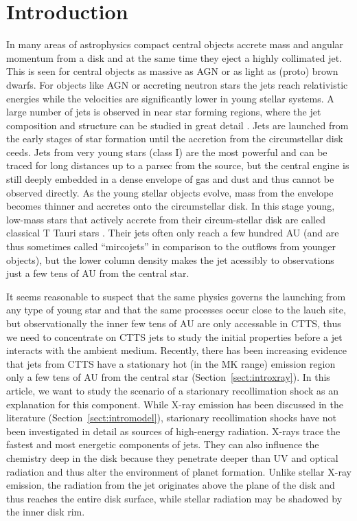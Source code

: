 \section{Introduction} 
In many areas of astrophysics compact central objects accrete mass and angular momentum from a disk and at the same time they eject a highly collimated jet. This is seen for central objects as massive as AGN or as light as (proto) brown dwarfs. For objects like AGN or accreting neutron stars the jets reach relativistic energies while the velocities are significantly lower in young stellar systems. 
A large number of jets is observed in near star forming regions, where the jet composition and structure can be studied in great detail \citep[see the review by][]{2014arXiv1402.3553F}.
Jets are launched from the early stages of star formation until the accretion from the circumstellar disk ceeds. Jets from very young stars (class I) are the most powerful and can be traced for long distances up to a parsec from the source, but the central engine is still deeply embedded in a dense envelope of gas and dust and thus cannot be observed directly. As the young stellar objects evolve, mass from the envelope becomes thinner and accretes onto the circumstellar disk. In this stage young, low-mass stars that actively accrete from their circum-stellar disk are called classical T Tauri stars \citep[for a review see][]{2013AN....334...67G}. Their jets often only reach a few hundred AU (and are thus sometimes called ``mircojets'' in comparison to the outflows from younger objects), but the lower column density makes the jet acessibly to observations just a few tens of AU from the central star.

It seems reasonable to suspect that the same physics governs the launching from any type of young star and that the same processes occur close to the lauch site, but observationally the inner few tens of AU are only accessable in CTTS, thus we need to concentrate on CTTS jets to study the initial properties before a jet interacts with the ambient medium. Recently, there has been increasing evidence that jets from CTTS have a stationary hot (in the MK range) emission region only a few tens of AU from the central star (Section~\ref{sect:introxray}). In this article, we want to study the scenario of a starionary recollimation shock as an explanation for this component. While X-ray emission has been discussed in the literature (Section~\ref{sect:intromodel}), starionary recollimation shocks have not been investigated in detail as sources of high-energy radiation. X-rays trace the fastest and most energetic components of jets. They can also influence the chemistry deep in the disk \citep[e.g.][]{2010ApJ...714.1511H,2012ApJ...756..157G} because they penetrate deeper than UV and optical radiation and thus alter the environment of planet formation. Unlike stellar X-ray emission, the radiation from the jet originates above the plane of the disk and thus reaches the entire disk surface, while stellar radiation may be shadowed by the inner disk rim.

